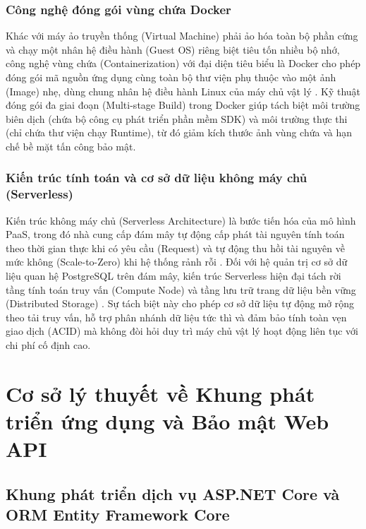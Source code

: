 \subsubsection{Công nghệ đóng gói vùng chứa Docker}

Khác với máy ảo truyền thống (Virtual Machine) phải ảo hóa toàn bộ phần cứng và chạy một nhân hệ điều hành (Guest OS) riêng biệt tiêu tốn nhiều bộ nhớ, công nghệ vùng chứa (Containerization) với đại diện tiêu biểu là Docker cho phép đóng gói mã nguồn ứng dụng cùng toàn bộ thư viện phụ thuộc vào một ảnh (Image) nhẹ, dùng chung nhân hệ điều hành Linux của máy chủ vật lý \cite{merkel2014docker}. Kỹ thuật đóng gói đa giai đoạn (Multi-stage Build) trong Docker giúp tách biệt môi trường biên dịch (chứa bộ công cụ phát triển phần mềm SDK) và môi trường thực thi (chỉ chứa thư viện chạy Runtime), từ đó giảm kích thước ảnh vùng chứa và hạn chế bề mặt tấn công bảo mật.

\subsubsection{Kiến trúc tính toán và cơ sở dữ liệu không máy chủ (Serverless)}

Kiến trúc không máy chủ (Serverless Architecture) là bước tiến hóa của mô hình PaaS, trong đó nhà cung cấp đám mây tự động cấp phát tài nguyên tính toán theo thời gian thực khi có yêu cầu (Request) và tự động thu hồi tài nguyên về mức không (Scale-to-Zero) khi hệ thống rảnh rỗi \cite{mell2011nist}. Đối với hệ quản trị cơ sở dữ liệu quan hệ PostgreSQL trên đám mây, kiến trúc Serverless hiện đại tách rời tầng tính toán truy vấn (Compute Node) và tầng lưu trữ trang dữ liệu bền vững (Distributed Storage) \cite{postgresql2024docs}. Sự tách biệt này cho phép cơ sở dữ liệu tự động mở rộng theo tải truy vấn, hỗ trợ phân nhánh dữ liệu tức thì và đảm bảo tính toàn vẹn giao dịch (ACID) mà không đòi hỏi duy trì máy chủ vật lý hoạt động liên tục với chi phí cố định cao.

\section{Cơ sở lý thuyết về Khung phát triển ứng dụng và Bảo mật Web API}

\subsection{Khung phát triển dịch vụ ASP.NET Core và ORM Entity Framework Core}

